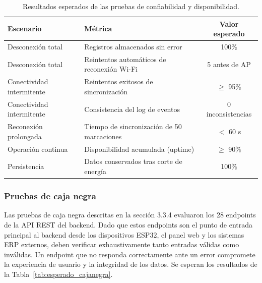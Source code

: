\documentclass{iccmemoria}
\begin{document}
\begin{table}[H]
\centering
\small
\begin{tabular}{|p{6cm}|p{5cm}|c|}
\hline
\textbf{Escenario} & \textbf{Métrica} & \textbf{Valor esperado} \\
\hline
Desconexión total & Registros almacenados sin error & 100\% \\
Desconexión total & Reintentos automáticos de reconexión Wi-Fi & 5 antes de AP \\
Conectividad intermitente & Reintentos exitosos de sincronización & $\geq$ 95\% \\
Conectividad intermitente & Consistencia del log de eventos & 0 inconsistencias \\
Reconexión prolongada & Tiempo de sincronización de 50 marcaciones & $<$ 60 s \\
Operación continua & Disponibilidad acumulada (uptime) & $\geq$ 90\% \\
Persistencia & Datos conservados tras corte de energía & 100\% \\
\hline
\end{tabular}
\caption{Resultados esperados de las pruebas de confiabilidad y disponibilidad.}
\label{tab:esperado_confiabilidad}
\end{table}

\subsubsection{Pruebas de caja negra}
Las pruebas de caja negra descritas en la sección 3.3.4 evaluaron los 28 endpoints de la API REST del backend. Dado que estos endpoints son el punto de entrada principal al backend desde los dispositivos ESP32, el panel web y los sistemas ERP externos, deben verificar exhaustivamente tanto entradas válidas como inválidas. Un endpoint que no responda correctamente ante un error compromete la experiencia de usuario y la integridad de los datos. Se esperan los resultados de la Tabla~\ref{tab:esperado_cajanegra}.
\end{document}
